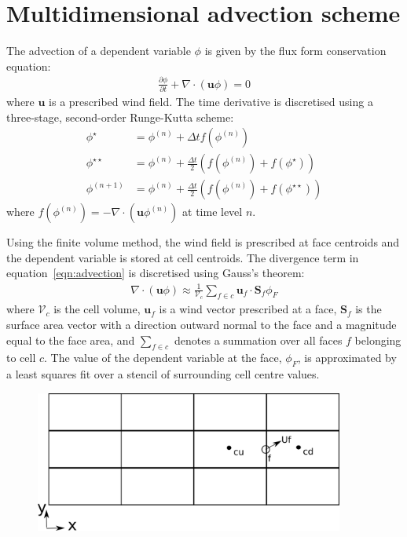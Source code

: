 \documentclass{standalone}
\begin{document}
\section{Multidimensional advection scheme}

The advection of a dependent variable $\phi$ is given by the flux form conservation equation:
\begin{align}
	\frac{\partial \phi}{\partial t} + \nabla \cdot \left( \bm{u} \phi \right) = 0 \label{eqn:advection}
\end{align}
where $\bm{u}$ is a prescribed wind field.  The time derivative is discretised using a three-stage, second-order Runge-Kutta scheme:
\begin{subequations}
\begin{align}
	\phi^\star &= \phi^{(n)} + \Delta t f(\phi^{(n)}) \\
	\phi^{\star\star} &= \phi^{(n)} + \frac{\Delta t}{2} \left( f(\phi^{(n)}) + f(\phi^\star) \right) \\
	\phi^{(n+1)} &= \phi^{(n)} + \frac{\Delta t}{2} \left( f(\phi^{(n)}) + f(\phi^{\star\star}) \right)
\end{align}
\end{subequations}
where \(f(\phi^{(n)}) = - \nabla \cdot (\bm{u} \phi^{(n)})\) at time level \(n\).

Using the finite volume method, the wind field is prescribed at face centroids and the dependent variable is stored at cell centroids.  The divergence term in equation~\eqref{eqn:advection} is discretised using Gauss's theorem:
\begin{align}
	\nabla \cdot \left( \bm{u} \phi \right) \approx \frac{1}{\mathcal{V}_c} \sum_{f \in c} \bm{u}_f \cdot \bm{S}_f \phi_F
\end{align}
where $\mathcal{V}_c$ is the cell volume, $\bm{u}_f$ is a wind vector prescribed at a face, ${\bm{S}_f}$ is the surface area vector with a direction outward normal to the face and a magnitude equal to the face area, and $\sum_{f \in c}$ denotes a summation over all faces $f$ belonging to cell $c$.  The value of the dependent variable at the face, $\phi_F$, is approximated by a least squares fit over a stencil of surrounding cell centre values.

\begin{figure}
	\centering
	\includegraphics[width=4in]{interiorQuadStencil.png}
	\caption{}
	\label{fig:interiorQuadStencil}
\end{figure}
\end{document}
